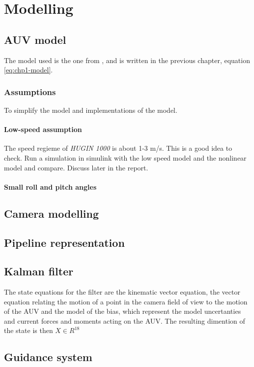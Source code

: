 \chapter{Modelling}


\section{AUV model}
	The model used is the one from \cite{fossen}, and is written in the previous chapter, equation \eqref{eq:chp1-model}.
	
	\subsection{Assumptions}
	To simplify the model and implementations of the model. 
		\subsubsection{Low-speed assumption}
		The speed regieme of \textit{HUGIN 1000} is about 1-3 m/s. This is a good idea to check. Run a simulation in simulink with the low speed model and the nonlinear model and compare. Discuss later in the report.

		\subsubsection{Small roll and pitch angles}


\section{Camera modelling}
	
	


\section{Pipeline representation}


\section{Kalman filter}
	The state equations for the filter are the kinematic vector equation, the vector equation relating the motion of a point in the camera field of view to the motion of the AUV and the model of the bias, which represent the model uncertanties and current forces and moments acting on the AUV. The resulting dimention of the state is then $ X \in R^18$ 
	
	
	

\section{Guidance system}
